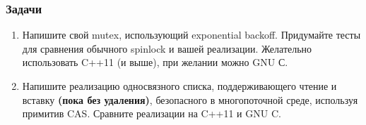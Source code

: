 \documentclass[aspectratio=169, pdf, 8pt, unicode]{beamer}
\begin{document}
\begin{frame}
\frametitle{Задачи}
\begin{enumerate}
\item Напишите свой mutex, использующий exponential backoff. Придумайте тесты для сравнения обычного spinlock и вашей реализации.
   Желательно использовать C++11 (и выше), при желании можно GNU С.
\item Напишите реализацию односвязного списка, поддерживающего чтение и вставку \textbf{(пока без удаления)}, безопасного в многопоточной среде,
   используя примитив CAS. Сравните реализации на C++11 и GNU C.
\end{enumerate}
\end{frame}
\end{document}
